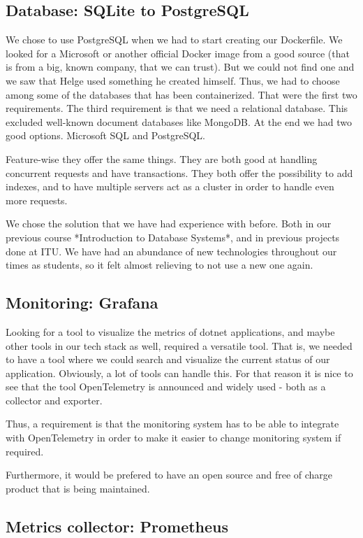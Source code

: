 \subsection{Database: SQLite to PostgreSQL}

We chose to use PostgreSQL when we had to start creating our Dockerfile. We looked for a Microsoft or another official Docker image from a good source (that is from a big, known company, that we can trust). But we could not find one and we saw that Helge used something he created himself. Thus, we had to choose among some of the databases that has been containerized. That were the first two requirements. The third requirement is that we need a relational database. This excluded well-known document databases like MongoDB. At the end we had two good options. Microsoft SQL and PostgreSQL.

Feature-wise they offer the same things. They are both good at handling concurrent requests and have transactions. They both offer the possibility to add indexes, and to have multiple servers act as a cluster in order to handle even more requests.

We chose the solution that we have had experience with before. Both in our previous course *Introduction to Database Systems*, and in previous projects done at ITU. We have had an abundance of new technologies throughout our times as students, so it felt almost relieving to not use a new one again.

\subsection{Monitoring: Grafana}

Looking for a tool to visualize the metrics of dotnet applications, and maybe other tools in our tech stack as well, required a versatile tool. That is, we needed to have a tool where we could search and visualize the current status of our application. Obviously, a lot of tools can handle this. For that reason it is nice to see that the tool OpenTelemetry is announced and widely used - both as a collector and exporter.

Thus, a requirement is that the monitoring system has to be able to integrate with OpenTelemetry in order to make it easier to change monitoring system if required.

Furthermore, it would be prefered to have an open source and free of charge product that is being maintained.

\subsection{Metrics collector: Prometheus}

